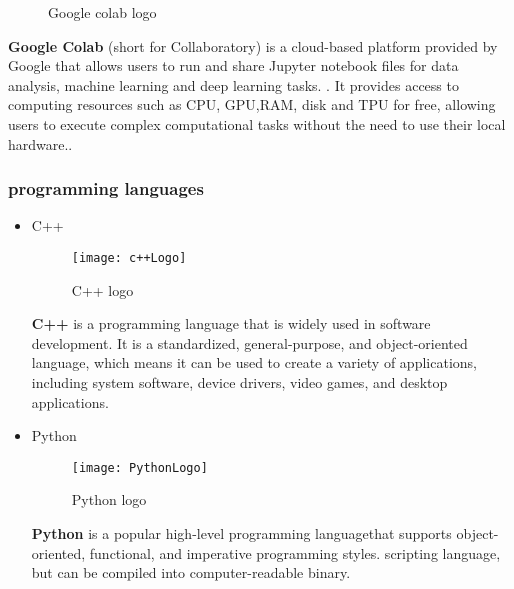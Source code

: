 \begin{itemize}
\begin{figure}[h]
        \caption{Google colab logo}
        \label{fig: Google Colab logo}
    \end{figure}
\FloatBarrier
\subitem\textbf{Google Colab} (short for Collaboratory) is a cloud-based platform provided by Google that allows users to run and share Jupyter notebook files for data analysis, machine learning and deep learning tasks. .\cite{GRND}
\subitem It provides access to computing resources such as CPU, GPU,RAM, disk and TPU for free, allowing users to execute complex computational tasks without the need to use their local hardware..\cite{GRND}
\end{itemize}

\subsubsection{programming languages}
\begin{itemize}

\item C++
\FloatBarrier
\begin{figure}[h]
         \centering
        \texttt{[image: c++Logo]}
   
        \caption{C++ logo}
        \label{fig:c++Logo}
    \end{figure}
\FloatBarrier
\subitem\textbf{C++} is a programming language that is widely used in software development. It is a standardized, general-purpose, and object-oriented language, which means it can be used to create a variety of applications, including system software, device drivers, video games, and desktop applications.\cite{SD20}

\item Python
\begin{figure}[h]
\FloatBarrier
         \centering
        \texttt{[image: PythonLogo]}
   
        \caption{Python logo}
        \label{fig:PythonLogo}
\FloatBarrier
    \end{figure}
\subitem\textbf{Python} is a popular high-level programming languagethat supports object-oriented, functional, 
and imperative programming styles. scripting language, but can be compiled into computer-readable binary.\cite{SD20}


\end{itemize}
%




%